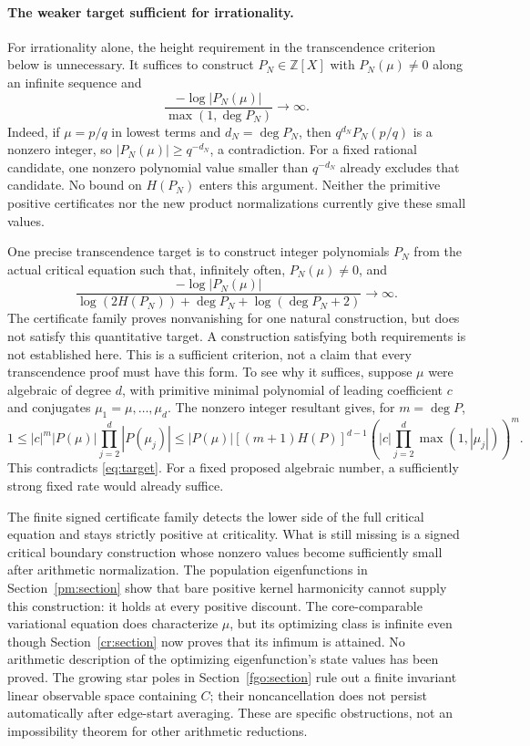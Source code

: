 \documentclass[11pt]{article}
\theoremstyle{remark}
\begin{document}
\paragraph{The weaker target sufficient for irrationality.}
For irrationality alone, the height requirement in the transcendence
criterion below is unnecessary. It suffices to construct
$P_N\in\mathbb Z[X]$ with $P_N(\mu)\ne0$ along an infinite sequence and
\[
 \frac{-\log|P_N(\mu)|}{\max(1,\deg P_N)}\longrightarrow\infty.
\]
Indeed, if $\mu=p/q$ in lowest terms and $d_N=\deg P_N$, then
$q^{d_N}P_N(p/q)$ is a nonzero integer, so
$|P_N(\mu)|\ge q^{-d_N}$, a contradiction. For a fixed rational
candidate, one nonzero polynomial value smaller than $q^{-d_N}$ already
excludes that candidate. No bound on $H(P_N)$ enters this argument.
Neither the primitive positive certificates nor the new product
normalizations currently give these small values.

One precise transcendence target is to construct integer polynomials
$P_N$ from the actual critical equation such that, infinitely often,
$P_N(\mu)\ne0$, and
\begin{equation}\label{eq:target}
 \frac{-\log|P_N(\mu)|}
 {\log(2H(P_N))+\deg P_N+\log(\deg P_N+2)}\longrightarrow\infty.
\end{equation}
The certificate family proves nonvanishing for one natural construction,
but does not satisfy this quantitative target. A construction satisfying
both requirements is not established here.
This is a sufficient criterion, not a claim that every transcendence
proof must have this form. To see why it suffices, suppose $\mu$ were
algebraic of degree $d$, with primitive minimal polynomial of leading
coefficient $c$ and conjugates $\mu_1=\mu,\ldots,\mu_d$. The nonzero
integer resultant gives, for $m=\deg P$,
\[
 1\le |c|^m|P(\mu)|\prod_{j=2}^d|P(\mu_j)|
 \le |P(\mu)|[(m+1)H(P)]^{d-1}
       \left(|c|\prod_{j=2}^d\max(1,|\mu_j|)\right)^m.
\]
This contradicts \eqref{eq:target}. For a fixed proposed algebraic
number, a sufficiently strong fixed rate would already suffice.

The finite signed certificate family detects the lower side of the
full critical equation and stays strictly positive at criticality.
What is still missing is a signed critical boundary construction whose
nonzero values become sufficiently small after arithmetic normalization.
The population eigenfunctions in Section~\ref{pm:section} show that
bare positive kernel harmonicity cannot supply this construction:
it holds at every positive discount. The core-comparable variational
equation does characterize $\mu$, but its optimizing class is infinite
even though Section~\ref{cr:section} now proves that its infimum is
attained. No arithmetic description of the optimizing eigenfunction's
state values has been proved. The growing star poles
in Section~\ref{fgo:section} rule out a finite invariant linear
observable space containing $C$; their noncancellation does not persist
automatically after edge-start averaging. These are specific obstructions,
not an impossibility theorem for other arithmetic reductions.
\end{document}
